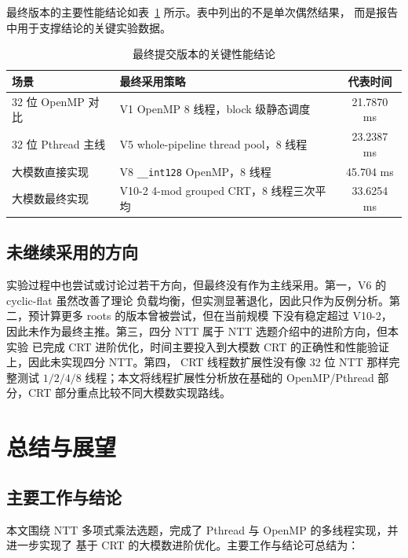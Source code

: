 \documentclass[UTF8,a4paper,10pt]{ctexart}
\begin{document}
最终版本的主要性能结论如表~\ref{tab:final-conclusion-table} 所示。表中列出的不是单次偶然结果，
而是报告中用于支撑结论的关键实验数据。

\begin{table}[H]
  \centering
  \begin{tabular}{lp{7.5cm}c}
  \toprule
  \textbf{场景} & \textbf{最终采用策略} & \textbf{代表时间}\\
  \midrule
  32 位 OpenMP 对比 & V1 OpenMP 8 线程，block 级静态调度 & 21.7870 ms\\
  32 位 Pthread 主线 & V5 whole-pipeline thread pool，8 线程 & 23.2387 ms\\
  大模数直接实现 & V8 \texttt{\_\_int128} OpenMP，8 线程 & 45.704 ms\\
  大模数最终实现 & V10-2 4-mod grouped CRT，8 线程三次平均 & 33.6254 ms\\
  \bottomrule
  \end{tabular}
  \caption{最终提交版本的关键性能结论}
  \label{tab:final-conclusion-table}
\end{table}

\subsection{未继续采用的方向}

实验过程中也尝试或讨论过若干方向，但最终没有作为主线采用。第一，V6 的 cyclic-flat 虽然改善了理论
负载均衡，但实测显著退化，因此只作为反例分析。第二，预计算更多 roots 的版本曾被尝试，但在当前规模
下没有稳定超过 V10-2，因此未作为最终主推。第三，四分 NTT 属于 NTT 选题介绍中的进阶方向，但本实验
已完成 CRT 进阶优化，时间主要投入到大模数 CRT 的正确性和性能验证上，因此未实现四分 NTT。第四，
CRT 线程数扩展性没有像 32 位 NTT 那样完整测试 $1/2/4/8$ 线程；本文将线程扩展性分析放在基础的
OpenMP/Pthread 部分，CRT 部分重点比较不同大模数实现路线。

\section{总结与展望}

\subsection{主要工作与结论}

本文围绕 NTT 多项式乘法选题，完成了 Pthread 与 OpenMP 的多线程实现，并进一步实现了
基于 CRT 的大模数进阶优化。主要工作与结论可总结为：
\end{document}
